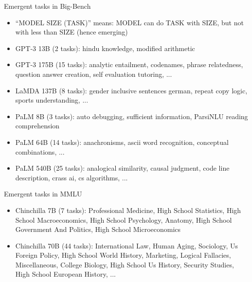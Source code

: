 \begin{vbframe}{Emergent tasks in Big-Bench}

\vfill

\begin{itemize}
\item ``MODEL SIZE (TASK)'' means: MODEL can do
TASK with SIZE, but not with less than SIZE (hence emerging)
    \item GPT-3 13B (2 tasks): hindu knowledge, modified arithmetic
    \item GPT-3 175B (15 tasks): analytic entailment, codenames, phrase relatedness, question answer creation, self evaluation tutoring, ...
    \item LaMDA 137B (8 tasks): gender inclusive sentences german, repeat copy logic, sports understanding, ...
    \item PaLM 8B (3 tasks): auto debugging, sufficient information, ParsiNLU reading comprehension
    \item PaLM 64B (14 tasks): anachronisms, ascii word recognition, conceptual combinations, ...
    \item PaLM 540B (25 tasks): analogical similarity, causal judgment, code line description, crass ai, cs algorithms, ...
\end{itemize}

\vfill

\end{vbframe}


\begin{vbframe}{Emergent tasks in MMLU}

\vfill

\begin{itemize}
    \item Chinchilla 7B (7 tasks): Professional Medicine, High School Statistics, High School Macroeconomics, High School Psychology, Anatomy, High School Government And Politics, High School Microeconomics
    \item Chinchilla 70B (44 tasks): International Law, Human Aging, Sociology, Us Foreign Policy, High School World History, Marketing, Logical Fallacies, Miscellaneous, College Biology, High School Us History, Security Studies, High School European History, ...
\end{itemize}

\vfill

\end{vbframe}

